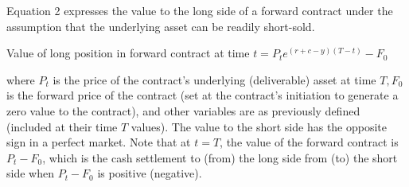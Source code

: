 \documentclass[11pt]{article}
\begin{document}
Equation 2 expresses the value to the long side of a forward contract under the assumption that the underlying asset can be readily short-sold.

Value of long position in forward contract at time $t=P_{t} e^{(r+c-y)(T-t)}-F_{0}$

where $P_{t}$ is the price of the contract's underlying (deliverable) asset at time $T, F_{0}$ is the forward price of the contract (set at the contract's initiation to generate a zero value to the contract), and other variables are as previously defined (included at their time $T$ values). The value to the short side has the opposite sign in a perfect market. Note that at $t=T$, the value of the forward contract is $P_{t}-F_{0}$, which is the cash settlement to (from) the long side from (to) the short side when $P_{t}-F_{0}$ is positive (negative).
\end{document}
